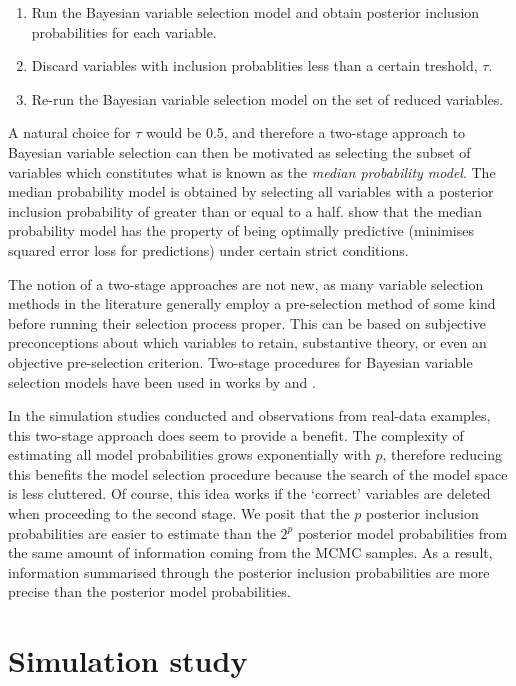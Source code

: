 \documentclass[showframe,11pt,twoside,openright]{report}
\begin{document}
\begin{enumerate}
  \item Run the Bayesian variable selection model and obtain posterior inclusion probabilities for each variable.
  \item Discard variables with inclusion probablities less than a certain treshold, $\tau$.
  \item Re-run the Bayesian variable selection model on the set of reduced variables.
\end{enumerate}

A natural choice for $\tau$ would be 0.5, and therefore a two-stage approach to Bayesian variable selection can then be motivated as selecting the subset of variables which constitutes what is known as the \emph{median probability model}.
The median probability model is obtained by selecting all variables with a posterior inclusion probability of greater than or equal to a half.
\citet{Barbieri2004} show that the median probability model has the property of being optimally predictive (minimises squared error loss for predictions) under certain strict conditions. 

The notion of a two-stage approaches are not new, as many variable selection methods in the literature generally employ a pre-selection method of some kind before running their selection process proper.
This can be based on subjective preconceptions about which variables to retain, substantive theory, or even an objective pre-selection criterion.
Two-stage procedures for Bayesian variable selection models have been used in works by \citet{Fouskakis2008} and \citet{Ntzoufras2008}. 

In the simulation studies conducted and observations from real-data examples, this two-stage approach does seem to provide a benefit.
The complexity of estimating all model probabilities grows exponentially with $p$, therefore reducing this benefits the model selection procedure because the search of the model space is less cluttered.
Of course, this idea works if the `correct' variables are deleted when proceeding to the second stage.
We posit that the $p$ posterior inclusion probabilities are easier to estimate than the $2^p$ posterior model probabilities from the same amount of information coming from the MCMC samples.
As a result, information summarised through the posterior inclusion probabilities are more precise than the posterior model probabilities.

\section{Simulation study}
\end{document}
